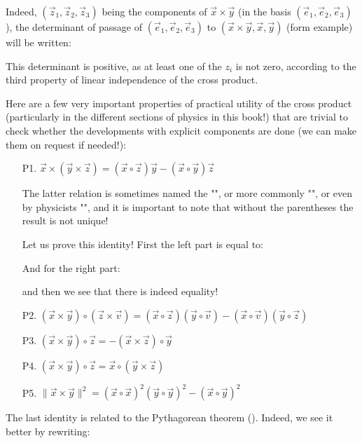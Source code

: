 	Indeed, $(\vec{z}_1,\vec{z}_2,\vec{z}_3)$ being the components of $\vec{x}\times \vec{y}$ (in the basis $(\vec{e}_1,\vec{e}_2,\vec{e}_3)$), the determinant of passage of $(\vec{e}_1,\vec{e}_2,\vec{e}_3)$ to $(\vec{x}\times \vec{y},\vec{x},\vec{y})$ (form example) will be written:
	 
	 This determinant is positive, as at least one of the $z_i$ is not zero, according to the third property of linear independence of the cross product.
	 
	 Here are a few very important properties of practical utility of the cross product (particularly in the different sections of physics in this book!) that are trivial to check whether the developments with explicit components are done (we can make them on request if needed!):
	\begin{enumerate}
		\item[P1.] $\vec{x}\times(\vec{y}\times\vec{z})=(\vec{x}\circ\vec{z})\vec{y}-(\vec{x}\circ\vec{y})\vec{z}$
		\begin{tcolorbox}[title=Remark,colframe=black,arc=10pt]
		The latter relation is sometimes named the "\label{grassman rule}", or more commonly "", or even by physicists "",  and it is important to note that without the parentheses the result is not unique!
		\end{tcolorbox}	
		Let us prove this identity! First the left part is equal to:
		
		And for the right part:
		
		and then we see that there is indeed equality!
		\item[P2.] $(\vec{x}\times\vec{y})\circ (\vec{z}\times\vec{v})=(\vec{x}\circ\vec{z})(\vec{y}\circ\vec{v})-(\vec{x}\circ\vec{v})(\vec{y}\circ\vec{z})$
		
		\item[P3.] $(\vec{x}\times\vec{y})\circ\vec{z}=-(\vec{x}\times\vec{z})\circ \vec{y}$
		
		\item[P4.] $(\vec{x}\times\vec{y})\circ\vec{z}=\vec{x}\circ(\vec{y}\times\vec{z})$
		
		\item[P5.] $\|\vec{x}\times\vec{y}\|^2=(\vec{x}\circ\vec{x})^2(\vec{y}\circ\vec{y})^2-(\vec{x}\circ\vec{y})^2$
	\end{enumerate}
	The last identity is related to the Pythagorean theorem (). Indeed, we see it better by rewriting:
	
